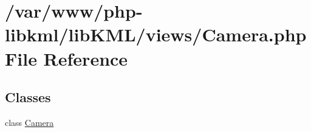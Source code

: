 \hypertarget{Camera_8php}{
\section{/var/www/php-\/libkml/libKML/views/Camera.php File Reference}
\label{db/db2/Camera_8php}
}
\subsection*{Classes}
\begin{DoxyCompactItemize}
\item 
class \hyperlink{classCamera}{Camera}
\end{DoxyCompactItemize}
